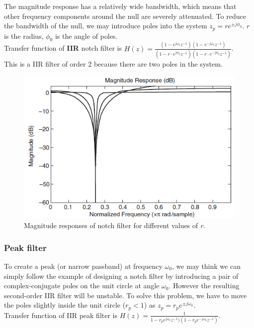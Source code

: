 The magnitude response has a relatively wide bandwidth, which means that other frequency components around the null are severely attenuated. 
To reduce the bandwidth of the null, we may introduce poles into the system $z_p = r e^{\pm j\phi_0}$. $r$ is the radius, $\phi_0$ is the angle of poles.\\

\noindent Transfer function of \textbf{IIR} notch filter is  $H(z) = \frac{(1-e^{j\omega_0} z^{-1})(1-e^{-j\omega_0} z^{-1})}{(1-r\cdot e^{j\phi_0} z^{-1})(1-r\cdot e^{-j\phi_0} z^{-1})} $. \\

\noindent This is a IIR filter of order 2 because there are two poles in the system.

\begin{figure} [H]
	\centering
	\includegraphics[width=0.85\linewidth]{graphics/11.png}
	\caption{Magnitude responses of notch filter for different values of \textit{r}.}
	\label{fig:11}
\end{figure}

\subsubsection{Peak filter}
To create a peak (or narrow passband) at frequency $\omega_0$, we may think we can simply follow the example of designing a notch filter by introducing a pair of complex-conjugate poles on the unit circle at angle $\omega_0$.
However the resulting second-order IIR filter will be unstable. To solve this
problem, we have to move the poles slightly inside the unit circle ($r_p < 1$) as $z_p = r_p e^{\pm j \omega_0}$.\\

\noindent Transfer function of IIR peak filter is  $H(z) = \frac{1}{1-r_p e^{j\omega_0} z^{-1})(1- r_p e^{-j\omega_0} z^{-1})}$.\\

